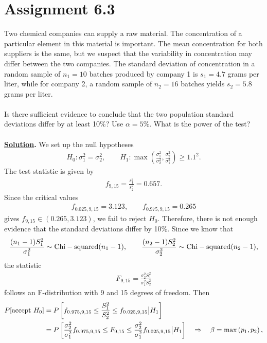 \section*{Assignment 6.3}

Two chemical companies can supply a raw material. The concentration of a particular element in this material is important. The mean concentration for both suppliers is the same, but we suspect that the variability in concentration may differ between the two companies. The standard deviation of concentration in a random sample of $n_1 = 10$ batches produced by company 1 is $s_1 = 4.7$ grams per liter, while for company 2, a random sample of $n_2 = 16$ batches yields $s_2 = 5.8$ grams per liter. \\
~\\
Is there sufficient evidence to conclude that the two population standard deviations differ by at least 10\%? Use $\alpha = 5\%$. What is the power of the test? \\
~\\
\textbf{\underline{Solution}.} We set up the null hypotheses
\begin{align*}
H_0: \sigma_1^2 = \sigma_2^2, \qquad H_1: \max\left(\frac{\sigma_1^2}{\sigma_2^2}, \frac{\sigma_2^2}{\sigma_1^2} \right) \geq 1.1^2.
\end{align*}
The test statistic is given by
\begin{align*}
f_{9, 15} = \frac{s_1^2}{s_2^2} = 0.657.
\end{align*}
Since the critical values
\begin{align*}
f_{0.025, 9, 15} = 3.123, \qquad f_{0.975, 9, 15} = 0.265
\end{align*}
gives $f_{9, 15}\in (0.265, 3.123)$, we fail to reject $H_0$. Therefore, there is not enough evidence that the standard deviations differ by 10\%. Since we know that
\begin{align*}
\frac{(n_1-1)S_1^2}{\sigma_1^2} \sim \mathrm{Chi-squared}(n_1-1), \qquad \frac{(n_2-1)S_2^2}{\sigma_2^2} \sim \mathrm{Chi-squared}(n_2-1),
\end{align*}
the statistic
\begin{align*}
F_{9, 15} = \frac{\sigma_2^2S_1^2}{\sigma_1^2S_2^2}
\end{align*}
follows an F-distribution with 9 and 15 degrees of freedom. Then
\begin{align*}
P[\mathrm{accept\ } H_0] & = P\left[f_{0.975,9,15} \leq \frac{S_1^2}{S_2^2} \leq f_{0.025,9,15} \big| H_1 \right] \\
& = P\left[\frac{\sigma_2^2}{\sigma_1^2} f_{0.975,9,15} \leq F_{9,15} \leq \frac{\sigma_2^2}{\sigma_1^2} f_{0.025,9,15} \big| H_1 \right] \quad\Rightarrow \quad \beta = \max\left(p_1, p_2 \right),
\end{align*}

